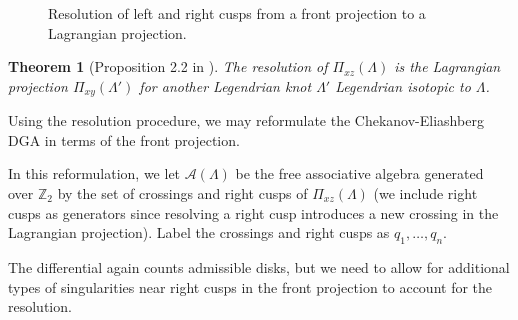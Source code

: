 \documentclass[a4paper,final, reqno]{amsart}
\theoremstyle{plain}
\newtheorem{Th}{Theorem}[section]
\theoremstyle{definition}
\newcommand{\A}{\mathcal{A}}
\begin{document}
\begin{figure}
		\caption[Resolution of a front projection]{Resolution of left and right cusps from a front projection to a Lagrangian projection.}\label{fig:resolution}
	\end{figure}
	
	
	
	\begin{Th}[Proposition 2.2 in \cite{ngres}]
		The resolution of $\Pi_{xz}(\Lambda)$ is the Lagrangian projection $\Pi_{xy}(\Lambda')$ for another Legendrian knot $\Lambda'$ Legendrian isotopic to $\Lambda$. 
	\end{Th}
	
	
	Using the resolution procedure, we may reformulate the Chekanov-Eliashberg DGA in terms of the front projection. 
	
	In this reformulation, we let $\A(\Lambda)$ be the free associative algebra generated over $\mathbb{Z}_2$ by the set of crossings and right cusps of $\Pi_{xz}(\Lambda)$ (we include right cusps as generators since resolving a right cusp introduces a new crossing in the Lagrangian projection). Label the crossings and right cusps as $q_1, \dots, q_n$. 
	
	The differential again counts admissible disks, but we need to allow for additional types of singularities near right cusps in the front projection to account for the resolution.
	
\end{document}
